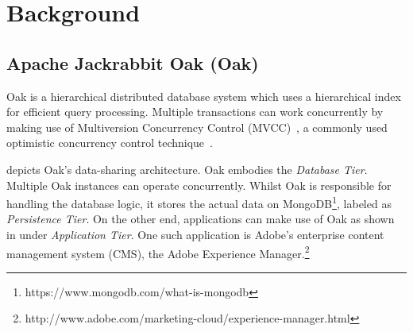 \message{ !name(thesis.tex)}\documentclass[abstracton,12pt]{scrartcl}
\theoremstyle{definition}
\begin{document}

\section{Background}

\subsection{Apache Jackrabbit Oak (Oak)}

Oak is a hierarchical distributed database system which uses a
hierarchical index for efficient query processing. Multiple transactions can
work concurrently by making use of
Multiversion Concurrency Control (MVCC)~\cite{GW02}, a commonly used optimistic
concurrency control technique~\cite{TM11}.

 depicts Oak's data-sharing architecture. Oak embodies the
\textit{Database Tier}. Multiple Oak instances can operate concurrently.
Whilst Oak is responsible for handling the database logic, it stores the actual
data on MongoDB\footnote{https://www.mongodb.com/what-is-mongodb}, labeled as
\textit{Persistence Tier}. On the other end, applications can make use of Oak as
shown in  under \textit{Application Tier}.
One such application is Adobe's enterprise content management system (CMS),
the Adobe Experience
Manager.\footnote{http://www.adobe.com/marketing-cloud/experience-manager.html}
\end{document}

